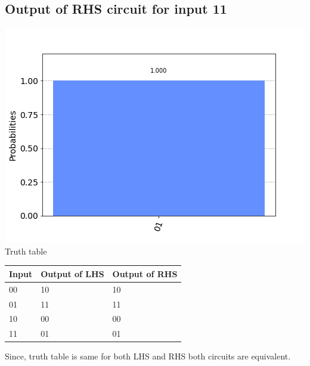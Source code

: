 \documentclass[a4paper]{article}
\begin{document}
\begin{answer}[Qeusiton 1 b (c)]
        \subsection*{Output of RHS circuit for input 11}
        \includegraphics[scale = 0.5]{c211-out.png}
        Truth table        
        \begin{center}
            \begin{tabular}{ | m{3cm}| m{3cm} |m{3cm}| } 
                \hline
                Input	&	Output of LHS & Output of RHS \\
                \hline
                00 & 10&10\\
                01 & 11&11\\
                10 & 00&00\\
                11 & 01&01\\
                \hline
            \end{tabular}
        \end{center} 
        Since, truth table is same for both LHS and RHS both circuits are equivalent. 
    \end{answer}    
\end{document}
